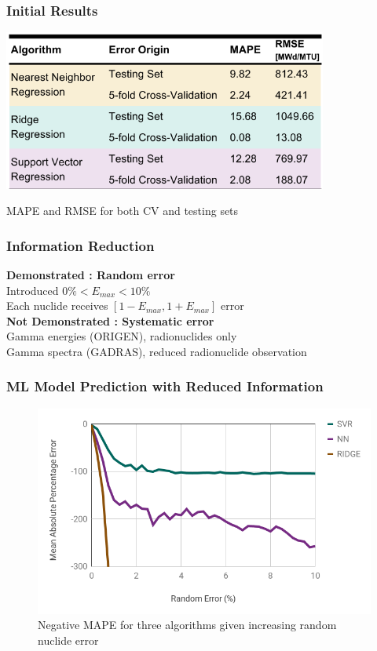 
\begin{frame}
  \frametitle{Initial Results}
  \begin{table}
    \centering
    \includegraphics[width=0.8\textwidth]{./figures/results1.png}
    \caption{MAPE and RMSE for both CV and testing sets}
  \end{table}
\end{frame}

\begin{frame}
  \frametitle{Information Reduction}
  \textbf{\large Demonstrated : Random error}\\
  Introduced $0\% < E_{max} < 10\%$\\
  Each nuclide receives $[1-E_{max},1+E_{max}]$ error\\
  \bigskip
  \bigskip
  \textbf{\large Not Demonstrated : Systematic error}\\
  Gamma energies (ORIGEN), radionuclides only\\
  Gamma spectra (GADRAS), reduced radionuclide observation
\end{frame}

\begin{frame}
  \frametitle{ML Model Prediction with Reduced Information}
  \begin{figure}
    \centering
    \includegraphics[height=0.7\textheight]{./figures/randerr.png}
    \caption{Negative MAPE for three algorithms given increasing random nuclide error}
  \end{figure}
\end{frame}

